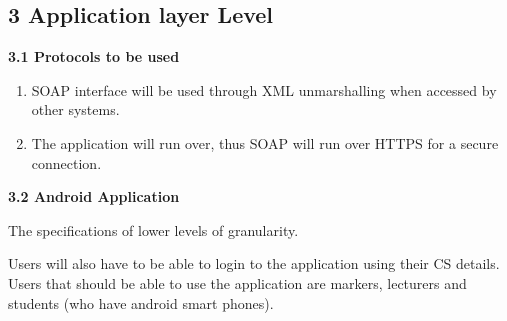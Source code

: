 \documentclass{article}
\begin{document}
\noindent 
\subsection{3  Application layer Level}

\noindent 

\textbf{3.1  Protocols to be used}

\begin{enumerate}
\item \textbf{ }SOAP interface will be used through XML unmarshalling when accessed by other systems. 

\item  The application will run over, thus SOAP will run over HTTPS for a secure connection. 
\end{enumerate}

 

\textbf{3.2  Android Application}

The specifications of lower levels of granularity.



\noindent Users will also have to be able to login to the application using their CS details. Users that should be able to use the application are markers, lecturers and students (who have android smart phones).
\end{document}
